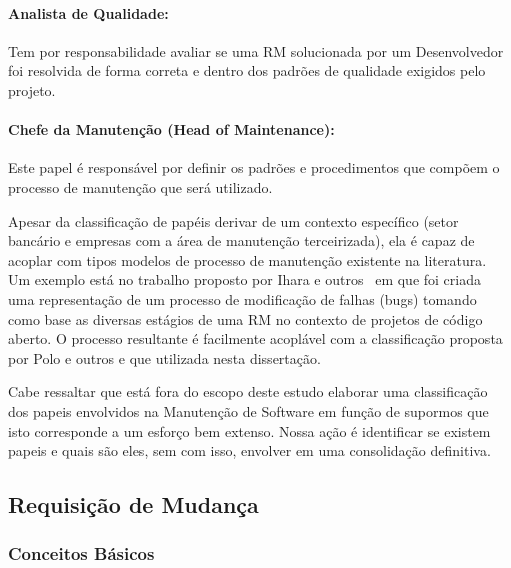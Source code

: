 \paragraph{Analista de Qualidade:}
Tem por responsabilidade avaliar se uma RM solucionada por um Desenvolvedor foi
resolvida de forma correta e dentro dos padrões de qualidade exigidos pelo
projeto.

\paragraph{Chefe da Manutenção (Head of	Maintenance):}
Este papel é responsável por definir os padrões e procedimentos que compõem o
processo de manutenção que será utilizado.

Apesar da classificação de papéis derivar de um contexto específico (setor
bancário e empresas com a área de manutenção terceirizada), ela é capaz de
acoplar com tipos modelos de processo de manutenção existente na literatura. Um
exemplo está no trabalho proposto por Ihara e
outros~\cite{Ihara:2009:AMI:1595808.1595833} em que foi criada uma representação
de um processo de modificação de falhas (bugs) tomando como base as diversas
estágios de uma RM no contexto de projetos de código aberto. O processo
resultante é facilmente acoplável com a classificação proposta por Polo e outros
e que utilizada nesta dissertação.

Cabe ressaltar que está fora do escopo deste estudo elaborar uma classificação dos
papeis envolvidos na Manutenção de Software em função de supormos que isto
corresponde a um esforço bem extenso. Nossa ação é identificar se existem papeis
e quais são eles, sem com isso, envolver em uma consolidação definitiva.

\subsection{Requisição de Mudança}
\label{sec:requisicao_de_mudanca}

\subsubsection{Conceitos Básicos}
\label{subsec:tipos_de_requisicoes_mudanca}



